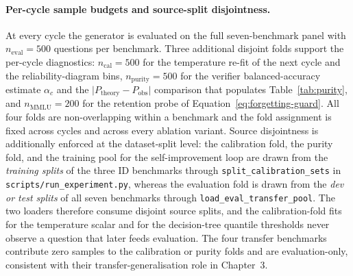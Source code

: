 \paragraph{Per-cycle sample budgets and source-split disjointness.}
At every cycle the generator is evaluated on the full seven-benchmark panel with $n_{\text{eval}} = 500$ questions per benchmark. Three additional disjoint folds support the per-cycle diagnostics: $n_{\text{cal}} = 500$ for the temperature re-fit of the next cycle and the reliability-diagram bins, $n_{\text{purity}} = 500$ for the verifier balanced-accuracy estimate $\alpha_{c}$ and the $\lvert P_{\text{theory}} - P_{\text{obs}}\rvert$ comparison that populates Table~\ref{tab:purity}, and $n_{\text{MMLU}} = 200$ for the retention probe of Equation~\ref{eq:forgetting-guard}. All four folds are non-overlapping within a benchmark and the fold assignment is fixed across cycles and across every ablation variant. Source disjointness is additionally enforced at the dataset-split level: the calibration fold, the purity fold, and the training pool for the self-improvement loop are drawn from the \emph{training splits} of the three ID benchmarks through \texttt{split\_calibration\_sets} in \texttt{scripts/run\_experiment.py}, whereas the evaluation fold is drawn from the \emph{dev or test splits} of all seven benchmarks through \texttt{load\_eval\_transfer\_pool}. The two loaders therefore consume disjoint source splits, and the calibration-fold fits for the temperature scalar and for the decision-tree quantile thresholds never observe a question that later feeds evaluation. The four transfer benchmarks contribute zero samples to the calibration or purity folds and are evaluation-only, consistent with their transfer-generalisation role in Chapter~3.

